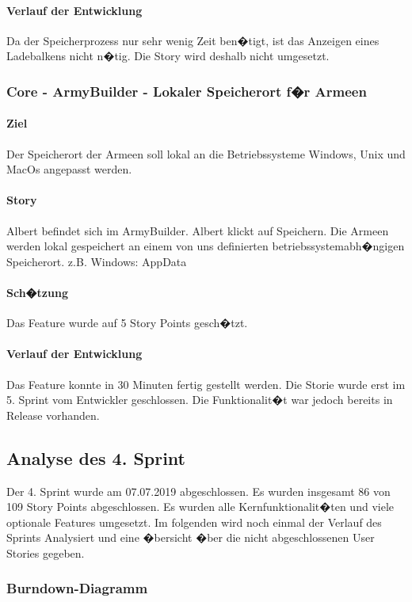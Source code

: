 \documentclass[12pt, titlepage]{scrartcl}
\newcommand{\RN}[1]{%
	\textup{\uppercase\expandafter{\romannumeral#1}}%
}
\begin{document}
			\paragraph{Verlauf der Entwicklung} 
			Da der Speicherprozess nur sehr wenig Zeit ben�tigt, ist das Anzeigen eines Ladebalkens nicht n�tig. Die Story wird deshalb nicht umgesetzt.
			\subsubsection{Core - ArmyBuilder - Lokaler Speicherort f�r Armeen}
			\paragraph{Ziel} Der Speicherort der Armeen soll lokal an die Betriebssysteme Windows, Unix und MacOs angepasst werden. 
			\paragraph{Story} Albert befindet sich im ArmyBuilder. Albert klickt auf Speichern. Die Armeen werden lokal gespeichert an einem von uns definierten betriebssystemabh�ngigen Speicherort.
			z.B. Windows: AppData 
			\paragraph{Sch�tzung}
			Das Feature wurde auf 5 Story Points gesch�tzt.
			\paragraph{Verlauf der Entwicklung} 
			Das Feature konnte in 30 Minuten fertig gestellt werden. Die Storie wurde erst im 5. Sprint vom Entwickler geschlossen. Die Funktionalit�t war jedoch bereits in Release \RN{2} vorhanden.
			
		\subsection{Analyse des 4. Sprint}
			Der 4. Sprint wurde am 07.07.2019 abgeschlossen. Es wurden insgesamt 86 von 109 Story Points abgeschlossen. Es wurden alle Kernfunktionalit�ten und viele optionale Features umgesetzt. Im folgenden wird noch einmal der Verlauf des Sprints Analysiert und eine �bersicht �ber die nicht abgeschlossenen User Stories gegeben. 
		
			\subsubsection{Burndown-Diagramm}
		
\end{document}
